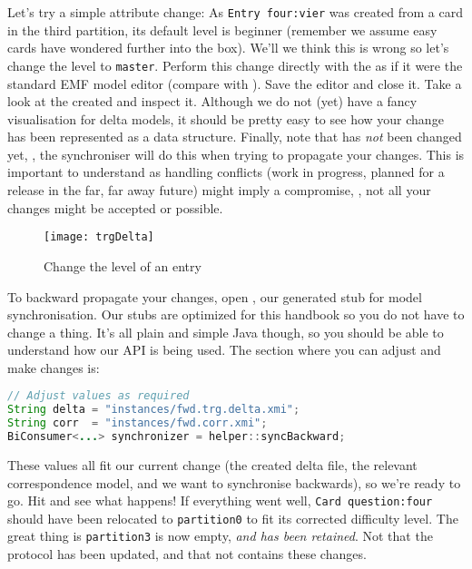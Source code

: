 \begin{stepbystep}
\item Let's try a simple attribute change:  As \texttt{Entry four:vier} was created from a card in the third partition, its default level is beginner (remember we assume easy cards have wondered further into the box).
We'll we think this is wrong so let's change the level to \texttt{master}.
Perform this change directly with the  as if it were the standard EMF model editor (compare with ).
Save the editor and close it.
Take a look at the created  and inspect it.
Although we do not (yet) have a fancy visualisation for delta models, it should be pretty easy to see how your change has been represented as a data structure.
Finally, note that  has \emph{not} been changed yet, \idest, the synchroniser will do this when trying to propagate your changes.
This is important to understand as handling conflicts (work in progress, planned for a release in the far, far away future) might imply a compromise, \idest, not all your changes might be accepted or possible.

\begin{figure}[htbp]
\begin{center}
  \texttt{[image: trgDelta]}
  \caption{Change the level of an entry}
  \label{fig:trgDelta}
\end{center}
\end{figure}

\item To backward propagate your changes, open
, our generated stub for model synchronisation.
Our stubs are optimized for this handbook so you do not have to change a thing.
It's all plain and simple Java though, so you should be able to understand
how our API is being used.
The section where you can adjust and make changes is:
\begin{lstlisting}[language=Java]
// Adjust values as required
String delta = "instances/fwd.trg.delta.xmi";
String corr  = "instances/fwd.corr.xmi";
BiConsumer<...> synchronizer = helper::syncBackward;
\end{lstlisting}

These values all fit our current change (the created delta file, the relevant correspondence model, and we want to synchronise backwards), so we're ready to go.
Hit  and see what happens!
If everything went well, \texttt{Card question:four} should have been relocated to \texttt{partition0} to fit its corrected difficulty level.
The great thing is \texttt{partition3} is now empty, \emph{and has been retained}.
Not that the protocol has been updated, and that  not contains these changes.
\end{stepbystep}


